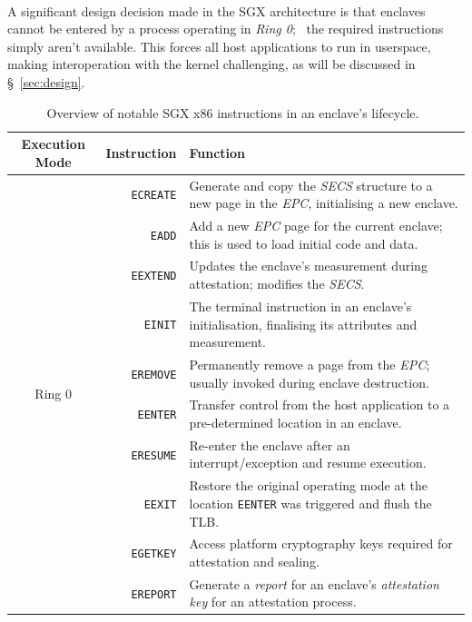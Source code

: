 \paragraph{} \label{sec:sgx-no-kernel-mode} A significant design decision made in the SGX architecture is that enclaves cannot be entered by a process operating in \textit{Ring 0};~\cite{sgx-prog-reference} the required instructions simply aren't available. This forces all host applications to run in userspace, making interoperation with the kernel challenging, as will be discussed in §~\ref{sec:design}.

\begin{table}
    \centering
    \newcommand\tableTop{\rule{0pt}{3ex}}
    \newcommand\tableMid{\rule{0pt}{3ex}}
    \newcommand\tableBottom{\rule[-2ex]{0pt}{0pt}}
    \begin{tabular}{|c|r|p{8.5cm}|} 
        \hline
        Execution Mode & Instruction & Function \\ [0.1ex] 
        \hline\hline
        \multirow{11}{*}{Ring 0} 
            & \tableTop{\texttt{ECREATE}} & \tableTop{Generate and copy the \textit{SECS} structure to a new page in the \textit{EPC}, initialising a new enclave.} \\ 
            & \texttt{EADD} & \tableMid{Add a new \textit{EPC} page for the current enclave; this is used to load initial code and data.} \\ 
            & \texttt{EEXTEND} & \tableMid{Updates the enclave's measurement during attestation; modifies the \textit{SECS}.} \\ 
            & \texttt{EINIT} & \tableMid{The terminal instruction in an enclave's initialisation, finalising its attributes and measurement.} \\ 
            & \texttt{EREMOVE} & \tableMid{Permanently remove a page from the \textit{EPC}; usually invoked during enclave destruction.} \tableBottom \\ 
        \hline\hline
        \multirow{11}{*}{Ring 3} 
        & \tableTop{\texttt{EENTER}} & \tableTop{Transfer control from the host application to a pre-determined location in an enclave.} \\ 
        & \texttt{ERESUME} & \tableMid{Re-enter the enclave after an interrupt/exception and resume execution.} \\ 
        & \texttt{EEXIT} & \tableMid{Restore the original operating mode at the location \texttt{EENTER} was triggered and flush the TLB.} \\ 
        & \texttt{EGETKEY} & \tableMid{Access platform cryptography keys required for attestation and sealing.} \\ 
        & \texttt{EREPORT} & \tableMid{Generate a \textit{report} for an enclave's \textit{attestation key} for an attestation process.} \tableBottom \\ 
        \hline
    \end{tabular}
    \vspace{5mm}
    \caption[Overview of notable SGX x86 instructions in an enclave's lifecycle.]{Overview of notable SGX x86 instructions in an enclave's lifecycle.~\cite{sgx-prog-reference}}
    \label{table:sgx-instructions}
\end{table}


